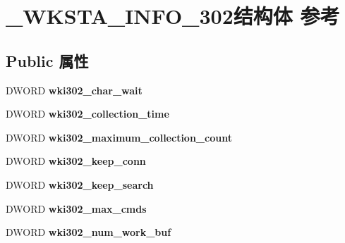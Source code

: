\hypertarget{struct___w_k_s_t_a___i_n_f_o__302}{}\section{\+\_\+\+W\+K\+S\+T\+A\+\_\+\+I\+N\+F\+O\+\_\+302结构体 参考}
\label{struct___w_k_s_t_a___i_n_f_o__302}
\subsection*{Public 属性}
\begin{DoxyCompactItemize}
\item 
\mbox{\label{struct___w_k_s_t_a___i_n_f_o__302_a1aad5d7c0840e4336a172e521e27cec0}} 
D\+W\+O\+RD {\bfseries wki302\+\_\+char\+\_\+wait}
\item 
\mbox{\label{struct___w_k_s_t_a___i_n_f_o__302_a4fe5454b31fff1cf0d89d477a7af683d}} 
D\+W\+O\+RD {\bfseries wki302\+\_\+collection\+\_\+time}
\item 
\mbox{\label{struct___w_k_s_t_a___i_n_f_o__302_a1a4cd7ce0e0f4d71331eb4725831dd87}} 
D\+W\+O\+RD {\bfseries wki302\+\_\+maximum\+\_\+collection\+\_\+count}
\item 
\mbox{\label{struct___w_k_s_t_a___i_n_f_o__302_ab2506954450ba418bde64fa64ce29402}} 
D\+W\+O\+RD {\bfseries wki302\+\_\+keep\+\_\+conn}
\item 
\mbox{\label{struct___w_k_s_t_a___i_n_f_o__302_a991020719aea67605bb0f00658659ba8}} 
D\+W\+O\+RD {\bfseries wki302\+\_\+keep\+\_\+search}
\item 
\mbox{\label{struct___w_k_s_t_a___i_n_f_o__302_a060ffdc31e78120865c2c53cfb2dc395}} 
D\+W\+O\+RD {\bfseries wki302\+\_\+max\+\_\+cmds}
\item 
\mbox{\label{struct___w_k_s_t_a___i_n_f_o__302_a71c1390a4a7ec11746c37515cca4dbd9}} 
D\+W\+O\+RD {\bfseries wki302\+\_\+num\+\_\+work\+\_\+buf}
\item 

\end{DoxyCompactItemize}
